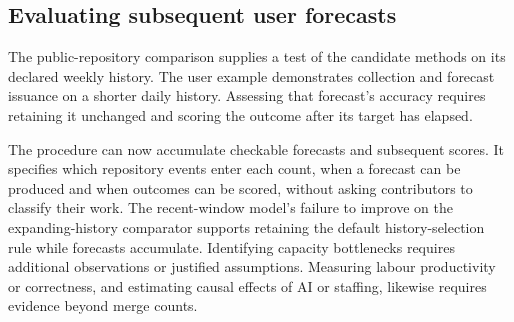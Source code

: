 \documentclass[11pt,a4paper]{article}
\begin{document}






\subsection{Evaluating subsequent user forecasts}

The public-repository comparison supplies a test of the candidate methods on its declared weekly history. The user example demonstrates collection and forecast issuance on a shorter daily history. Assessing that forecast's accuracy requires retaining it unchanged and scoring the outcome after its target has elapsed.

The procedure can now accumulate checkable forecasts and subsequent scores. It specifies which repository events enter each count, when a forecast can be produced and when outcomes can be scored, without asking contributors to classify their work. The recent-window model's failure to improve on the expanding-history comparator supports retaining the default history-selection rule while forecasts accumulate. Identifying capacity bottlenecks requires additional observations or justified assumptions. Measuring labour productivity or correctness, and estimating causal effects of AI or staffing, likewise requires evidence beyond merge counts.



\end{document}
